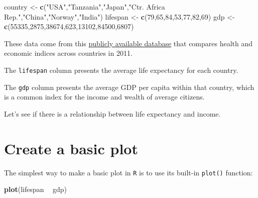 \documentclass[
]{book}
\newenvironment{Shaded}{\begin{snugshade}}{\end{snugshade}}
\newcommand{\DecValTok}[1]{\textcolor[rgb]{0.00,0.00,0.81}{#1}}
\newcommand{\KeywordTok}[1]{\textcolor[rgb]{0.13,0.29,0.53}{\textbf{#1}}}
\newcommand{\NormalTok}[1]{#1}
\newcommand{\OperatorTok}[1]{\textcolor[rgb]{0.81,0.36,0.00}{\textbf{#1}}}
\newcommand{\StringTok}[1]{\textcolor[rgb]{0.31,0.60,0.02}{#1}}
\begin{document}
\begin{Shaded}
\begin{Highlighting}[]
\NormalTok{country <-}\StringTok{ }\KeywordTok{c}\NormalTok{(}\StringTok{"USA"}\NormalTok{,}\StringTok{"Tanzania"}\NormalTok{,}\StringTok{"Japan"}\NormalTok{,}\StringTok{"Ctr. Africa Rep."}\NormalTok{,}\StringTok{"China"}\NormalTok{,}\StringTok{"Norway"}\NormalTok{,}\StringTok{"India"}\NormalTok{)}
\NormalTok{lifespan <-}\StringTok{ }\KeywordTok{c}\NormalTok{(}\DecValTok{79}\NormalTok{,}\DecValTok{65}\NormalTok{,}\DecValTok{84}\NormalTok{,}\DecValTok{53}\NormalTok{,}\DecValTok{77}\NormalTok{,}\DecValTok{82}\NormalTok{,}\DecValTok{69}\NormalTok{)}
\NormalTok{gdp <-}\StringTok{ }\KeywordTok{c}\NormalTok{(}\DecValTok{55335}\NormalTok{,}\DecValTok{2875}\NormalTok{,}\DecValTok{38674}\NormalTok{,}\DecValTok{623}\NormalTok{,}\DecValTok{13102}\NormalTok{,}\DecValTok{84500}\NormalTok{,}\DecValTok{6807}\NormalTok{)}
\end{Highlighting}
\end{Shaded}

These data come from this \href{https://datasets.iisg.amsterdam/dataset.xhtml?persistentId=hdl:10622/LKYT53}{publicly available database} that compares health and economic indices across countries in 2011.

The \texttt{lifespan} column presents the average life expectancy for each country.

The \texttt{gdp} column presents the average GDP per capita within that country, which is a common index for the income and wealth of average citizens.

Let's see if there is a relationship between life expectancy and income.

\hypertarget{create-a-basic-plot}{%
\section*{Create a basic plot}\label{create-a-basic-plot}}

The simplest way to make a basic plot in \texttt{R} is to use its built-in \texttt{plot()} function:

\begin{Shaded}
\begin{Highlighting}[]
\KeywordTok{plot}\NormalTok{(lifespan }\OperatorTok{~}\StringTok{ }\NormalTok{gdp)}
\end{Highlighting}
\end{Shaded}
\end{document}
